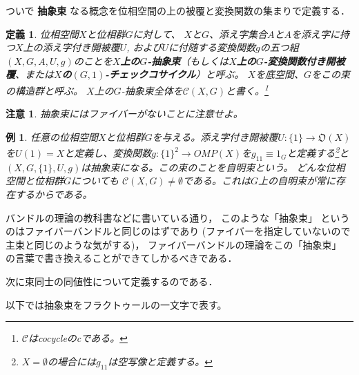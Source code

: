 \documentclass[leqno]{jsarticle}
\newtheorem{df}[thm]{定義}
\newtheorem{exam}[thm]{例}
\newtheorem*{cau}{注意}
\begin{document}
ついで
\textbf{抽象束}
なる概念を位相空間の上の被覆と変換関数の集まりで定義する．
\begin{df}
位相空間$X$と位相群$G$に対して、
$X$と$G$、添え字集合$A$と$A$を添え字に持つ$X$上の添え字付き開被覆$U$, および$U$に付随する変換関数$g$の五つ組$(X, G, A, U, g)$のことを\textbf{$X$上の$G$-抽象束}（もしくは\textbf{$X$上の$G$-変換関数付き開被覆}、または\textbf{$X$の$(G, 1)$-チェックコサイクル}）と呼ぶ。
$X$を底空間、$G$をこの束の構造群と呼ぶ。
$X$上の$G$-抽象束全体を$\mathscr{C}(X,G)$と書く。\footnote{$\mathscr{C}$はcocycleのcである。}
\end{df}
\begin{cau}
抽象束にはファイバーがないことに注意せよ。
\end{cau}
\begin{exam}
任意の位相空間$X$と位相群$G$を与える。添え字付き開被覆$U:\{1\}\to \mathfrak{O}(X)$を$U(1)=X$と定義し、変換関数$g:\{1\}^2\to OMP(X)$を$g_{11}\equiv1_G$と定義する\footnote{$X=\emptyset$の場合には$g_{11}$は空写像と定義する。}と$(X, G, \{1\}, U, g)$は抽象束になる。この束のことを自明束という。
どんな位相空間と位相群$G$についても
$\mathscr{C}(X,G)\neq \emptyset$である。これは$G$上の自明束が常に存在するからである。
\end{exam}


バンドルの理論の教科書などに書いている通り，
このような「抽象束」
というのはファイバーバンドルと同じのはずであり
(ファイバーを指定していないので主束と同じのような気がする)，
ファイバーバンドルの理論をこの「抽象束」
の言葉で書き換えることができてしかるべきである．

次に束同士の同値性について定義するのである．

以下では抽象束をフラクトゥールの一文字で表す。
\end{document}
